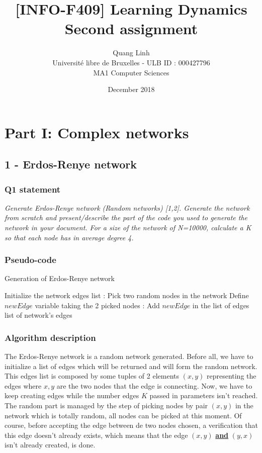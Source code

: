 \documentclass{article}
\title{[INFO-F409] Learning Dynamics \\ Second assignment}
\author{\bsc{BUI QUANG PHUONG} Quang Linh \\ Université libre de Bruxelles - ULB ID : 000427796  \\ MA1 Computer Sciences}
\date{December 2018}
\begin{document}
\maketitle

\tableofcontents

\newpage
\section{Part I: Complex networks}

\subsection{1 - Erdos-Renye network}

\subsubsection{Q1 statement}

\textit{Generate Erdos-Renye network (Random networks) [1,2]. Generate the network from scratch and present/describe the part of the code you used to generate the network in your document. For a size of the network of N=10000, calculate a K so that each node has in average degree 4.} 

\subsubsection*{Pseudo-code}

\begin{algorithm}
  \caption{Generation of Erdos-Renye network}\label{euclid}
  \begin{algorithmic}[1]
  \State Initialize the network edges list
  :
  \State Pick two random nodes in the network
  \State Define $newEdge$ variable taking the 2 picked nodes  
  \EndFor
  :
  \State Add $newEdge$ in the list of edges
  \EndIf
  \Return list of network's edges  
  \EndProcedure
  \end{algorithmic}
\end{algorithm}

\subsubsection*{Algorithm description} 

The Erdos-Renye network is a random network generated. Before all, we have to initialize a list of edges which will be returned and will form the random network. This edges list is composed by some tuples of 2 elements $(x,y)$ representing the edges where $x,y$ are the two nodes that the edge is connecting. Now, we have to keep creating edges while the number edges $K$ passed in parameters isn't reached. The random part is managed by the step of picking nodes by pair $(x,y)$ in the network which is totally random, all nodes can be picked at this moment. Of course, before accepting the edge between de two nodes chosen, a verification that this edge doesn't already exists, which means that the edge $(x,y)$ \textbf{\underline{and}} $(y,x)$ isn't already created, is done.
\end{document}

